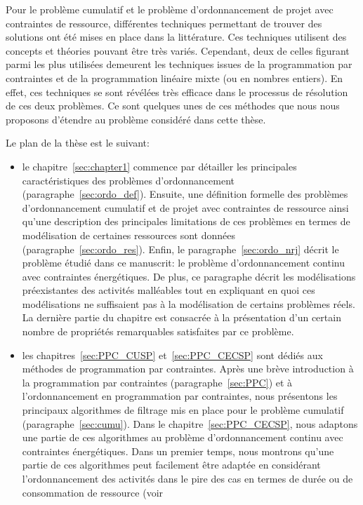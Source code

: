 Pour le problème cumulatif et le problème d'ordonnancement de projet
avec contraintes de ressource, différentes techniques permettant de
trouver des solutions ont été mises en place dans la littérature. Ces
techniques utilisent des concepts et théories pouvant être très
variés. Cependant, deux de celles figurant parmi les plus utilisées
demeurent les techniques issues de la programmation par contraintes et
de la programmation linéaire mixte (ou en nombres entiers). En effet,
ces techniques se sont révélées très efficace dans le processus de
résolution de ces deux problèmes. Ce sont quelques unes de ces
méthodes que nous nous proposons d'étendre au problème considéré dans
cette thèse.

Le plan de la thèse est le suivant: 
\begin{itemize}
\item le chapitre~\ref{sec:chapter1} commence par détailler les
principales caractéristiques des problèmes d'ordonnancement
(paragraphe~\ref{sec:ordo_def}). Ensuite, une définition formelle des
problèmes d'ordonnancement cumulatif et de projet
avec contraintes de ressource ainsi qu'une description des principales
limitations de ces problèmes en termes de modélisation de certaines
ressources sont données
(paragraphe~\ref{sec:ordo_res}).  Enfin, le
paragraphe~\ref{sec:ordo_nrj} décrit le problème étudié dans ce
manuscrit: le problème d'ordonnancement continu avec contraintes
énergétiques. De plus, ce paragraphe décrit les modélisations
préexistantes des activités malléables tout en expliquant en quoi ces
modélisations ne suffisaient pas à la modélisation de certains problèmes
réels. La dernière partie du chapitre est consacrée à la présentation
d'un certain nombre de propriétés remarquables satisfaites par ce problème.
\item les chapitres~\ref{sec:PPC_CUSP} et~\ref{sec:PPC_CECSP} sont
  dédiés aux méthodes de programmation par
  contraintes. Après une brève introduction à la programmation par
  contraintes (paragraphe~\ref{sec:PPC}) et à l'ordonnancement en
  programmation par contraintes, nous
  présentons les principaux algorithmes de filtrage mis en place pour
  le problème cumulatif (paragraphe~\ref{sec:cumu}). Dans le
  chapitre~\ref{sec:PPC_CECSP}, nous adaptons une partie de ces
  algorithmes au problème d'ordonnancement continu avec contraintes
  énergétiques. Dans un premier temps, nous montrons qu'une partie de
  ces algorithmes peut facilement être adaptée en considérant
  l'ordonnancement des activités dans le pire des cas en termes de
  durée ou de consommation de ressource (voir

\end{itemize}
